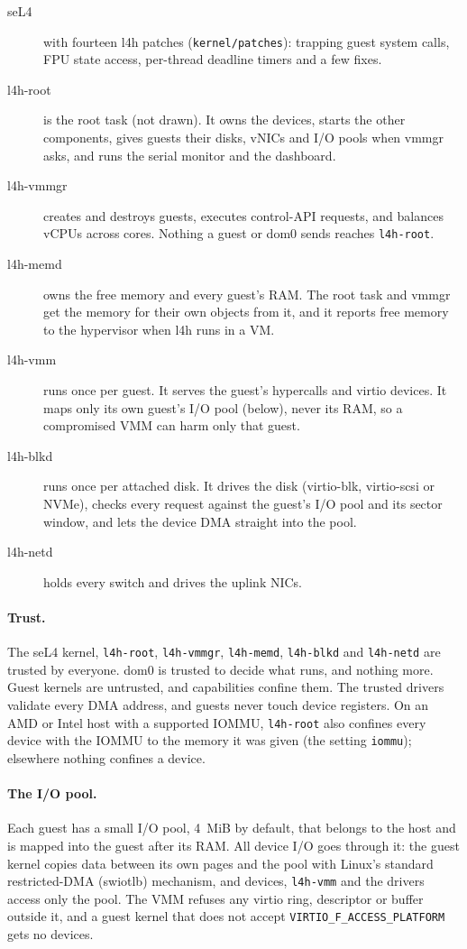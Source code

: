 \documentclass[11pt,a4paper]{report}
\newcommand{\file}[1]{\texttt{#1}}
\begin{document}
\begin{description}
  \item[seL4] with fourteen l4h patches (\file{kernel/patches}): trapping guest
    system calls, FPU state access, per-thread deadline timers and a few
    fixes.
  \item[l4h-root] is the root task (not drawn). It owns the devices, starts
    the other components, gives guests their disks, vNICs and I/O pools
    when vmmgr asks, and runs the serial monitor and the dashboard.
  \item[l4h-vmmgr] creates and destroys guests, executes control-API
    requests, and balances vCPUs across cores. Nothing a guest or dom0
    sends reaches \texttt{l4h-root}.
  \item[l4h-memd] owns the free memory and every guest's RAM. The root task
    and vmmgr get the memory for their own objects from it, and it reports
    free memory to the hypervisor when l4h runs in a VM.
  \item[l4h-vmm] runs once per guest. It serves the guest's hypercalls and
    virtio devices. It maps only its own guest's I/O pool (below), never its
    RAM, so a compromised VMM can harm only that guest.
  \item[l4h-blkd] runs once per attached disk. It drives the disk (virtio-blk,
    virtio-scsi or NVMe), checks every request against the guest's I/O pool and its
    sector window, and lets the device DMA straight into the pool.
  \item[l4h-netd] holds every switch and drives the uplink NICs.
\end{description}

\paragraph{Trust.} The seL4 kernel, \texttt{l4h-root}, \texttt{l4h-vmmgr},
\texttt{l4h-memd}, \texttt{l4h-blkd} and \texttt{l4h-netd} are trusted by everyone. dom0 is trusted to decide what
runs, and nothing more. Guest kernels are untrusted, and capabilities confine
them. The trusted drivers validate every DMA address, and guests never touch
device registers. On an AMD or Intel host with a supported IOMMU, \texttt{l4h-root} also confines every
device with the IOMMU to the memory it was given (the setting
\texttt{iommu}); elsewhere nothing confines a device.

\paragraph{The I/O pool.} Each guest has a small I/O pool, 4~MiB by
default, that belongs to the host and is mapped into the guest after its
RAM. All device I/O goes through it: the guest kernel copies data between
its own pages and the pool with Linux's standard restricted-DMA (swiotlb)
mechanism, and devices, \texttt{l4h-vmm} and the drivers access only the
pool. The VMM refuses any virtio ring, descriptor or buffer outside it,
and a guest kernel that does not accept
\texttt{VIRTIO\_F\_ACCESS\_PLATFORM} gets no devices.
\end{document}
